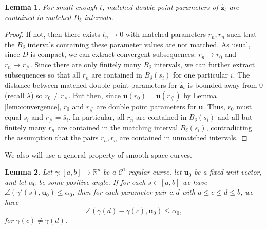 \documentclass[12pt]{article}
\numberwithin{equation}{subsection}
\newtheorem{lem}{Lemma}[thm]
\theoremstyle{definition}
\numberwithin{lem}{section}
\def\uu{\mathbf{u}}
\def\zhat{\mathbf{\hat{z}}}
\def\C{\mathcal{C}}
\begin{document}
\begin{lem} 
 \label{lem:MatchedParameters} 
 For small enough $t$, matched double point parameters of $\zhat_t$ are contained in matched $B_\delta$ intervals. 
\end{lem}

\begin{proof}If not, then there exists $t_n \rightarrow 0$ with matched parameters  $r_n, \bar{r}_n$ such that the $B_\delta$ intervals containing these parameter values are not matched.  As usual, since $D$ is compact, we can extract convergent subsequences: $r_n \rightarrow r_0$ and $\bar{r}_n \rightarrow r_\#$.  Since there are only finitely many $B_\delta$ intervals, we can further extract subsequences so that all $r_n$ are contained in $B_\delta(s_i)$ for one particular $i$. The distance between matched  double point parameters for $\zhat_t$ is bounded away from 0 (recall $\lambda$)  so $r_0 \neq r_\#$.  But then, since $\uu(r_0) = \uu(r_\#)$ by Lemma \ref{lem:convergence}, $r_0$ and $r_\#$ are double point parameters for $\uu$.  Thus, $r_0$ must equal $s_i$ and $r_\# = \bar{s}_i$.  In particular, all $r_n$ are contained in $B_\delta(s_i)$ and all but finitely many $\bar{r}_n$ are contained in the matching interval $B_\delta(\bar{s}_i)$, contradicting the assumption that the pairs $r_n, \bar{r}_n$ are contained in unmatched intervals.
\end{proof}

 We also will use a general property of smooth space curves. 
 
\begin{lem}
Let $\gamma: [a,b] \rightarrow \mathbb{R}^n$ be a $\C^1$ regular curve, let $\mathbf{u}_0$ be a fixed unit vector, and let $\alpha_0$ be some positive angle.  If for each $s \in [a,b]$ we have $\angle(\gamma'(s),\mathbf{u}_0) \leq \alpha_0$, then for each parameter pair $c,d$ with $a \leq c \leq d \leq b$, we have
$$\angle(\gamma(d) - \gamma(c), \mathbf{u}_0) \leq \alpha_0,$$
for $\gamma(c) \neq \gamma(d)$.
\label{lem:chordvector}
\end{lem}
\end{document}
